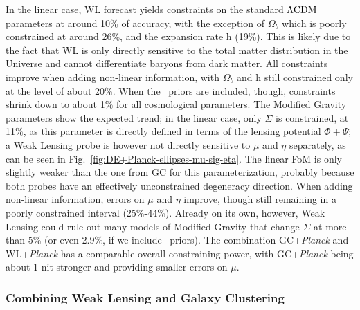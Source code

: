 In the linear case, WL forecast yields constraints on the standard $\Lambda\mathrm{CDM}$ parameters
at around 10\% of accuracy, with the exception of $\Omega_{b}$ which
is poorly constrained at around 26\%, and the expansion rate h (19\%). This is likely due to the fact
that WL is only directly sensitive to the total matter distribution
in the Universe and cannot differentiate baryons from dark matter. All constraints improve when adding non-linear information, with $\Omega_b$ and h still constrained only at the level of about $20\%$. When the \planck\ priors are included, though, constraints shrink down to about 1$\%$ for all cosmological parameters.
The Modified Gravity parameters show the expected
trend; in the linear case, only $\Sigma$ is constrained, at 11$\%$, as this parameter is directly defined in terms of the lensing potential $\Phi+\Psi$; a Weak Lensing
probe is however not directly sensitive to $\mu$ and $\eta$ separately, as can be seen in Fig.\ \ref{fig:DE+Planck-ellipses-mu-sig-eta}.
The linear FoM is only slightly weaker than the one from GC for this parameterization, probably because both probes have an effectively unconstrained degeneracy direction. When adding non-linear information, errors on $\mu$ and $\eta$ improve, though still remaining in a poorly constrained interval (25$\%$-44$\%$).
Already on its own, however, Weak Lensing could rule out many
models of Modified Gravity that change $\Sigma$ at more than $5\%$ (or even $2.9\%$, if we include \planck\ priors). The combination GC+{\it Planck} 
and WL+{\it Planck} has a comparable overall constraining power, with GC+{\it Planck} being about 1 nit stronger and providing smaller errors on $\mu$.

\subsubsection{Combining Weak Lensing and Galaxy Clustering}\label{subsub:late-time-comb-GC+WL}

